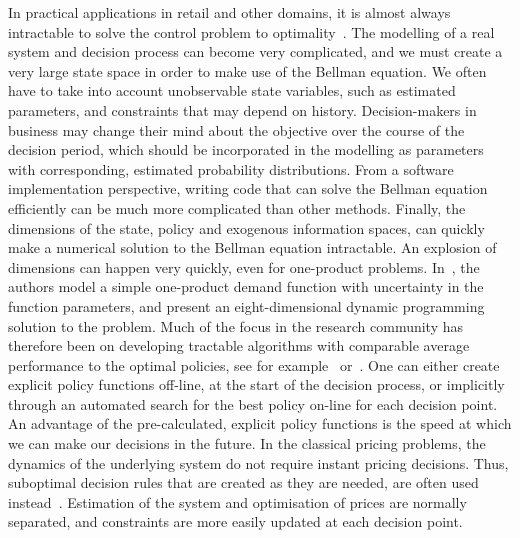 \documentclass[main.tex]{subfiles}
\begin{document}
In practical applications in retail and other domains, it is almost always
intractable to solve the control problem to optimality~\cite{farmer2017uncertainty}.
The modelling of a real system and decision process can become very
complicated, and  we must  create a very
large state space in order to make use of the Bellman equation.
We often have to take into account unobservable
state variables, such as estimated parameters, and constraints
that may depend on history. Decision-makers in business may change their mind
about the objective over the course of the decision period, which should
be incorporated in the modelling as parameters with corresponding, estimated
probability distributions.
From a software implementation perspective, writing code that can
solve the Bellman equation efficiently can be much more complicated
than other methods.
Finally, the dimensions of the state, policy and exogenous
information spaces, can quickly make a numerical solution to the Bellman
equation intractable. An explosion of dimensions can happen very
quickly, even for one-product problems.
In~\cite{bertsimas2001dynamic}, the authors model a simple
one-product demand function with uncertainty in the function
parameters, and present an eight-dimensional dynamic programming
solution to the problem.
Much of the focus in the research community has therefore been on
developing tractable algorithms with comparable average performance to the
optimal policies, see for
example~\cite{powell2011approximate} or~\cite{bertsekas2012dynamic}.
One can either create explicit policy functions off-line, at the
start of the decision process, or implicitly through an automated
search for the best policy on-line for each decision point.
An advantage of the pre-calculated, explicit policy functions
is the speed at which we can make our decisions in the
future. In the classical pricing problems, the dynamics of the
underlying system do not require instant pricing decisions. Thus,
suboptimal decision rules that are created as they are needed, are often used
instead~\cite{talluri2006theory}. Estimation of the system and optimisation of prices are
normally separated, and constraints are more easily updated at each
decision point.
\end{document}
